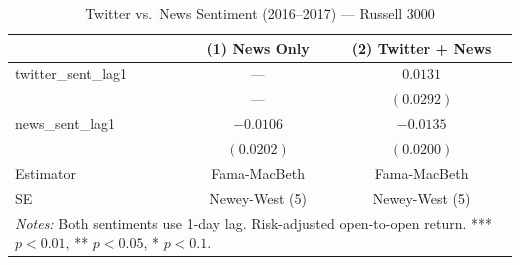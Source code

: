 \begin{table}[htbp]
\centering
\caption{Twitter vs.\ News Sentiment (2016--2017) --- Russell 3000}
\label{tab:russel_2016_t5}
\begin{tabular}{lcc}
\hline\hline
 & (1) News Only & (2) Twitter + News \\
\hline
twitter\_sent\_lag1 & --- & $0.0131$ \\
                     & --- & $(0.0292)$ \\
news\_sent\_lag1    & $-0.0106$ & $-0.0135$ \\
                     & $(0.0202)$ & $(0.0200)$ \\
\hline
Estimator & Fama-MacBeth & Fama-MacBeth \\
SE & Newey-West (5) & Newey-West (5) \\
\hline\hline
\multicolumn{3}{p{0.9\linewidth}}{\footnotesize \textit{Notes:} Both sentiments use 1-day lag. Risk-adjusted open-to-open return. *** $p<0.01$, ** $p<0.05$, * $p<0.1$.}\n\end{tabular}
\end{table}